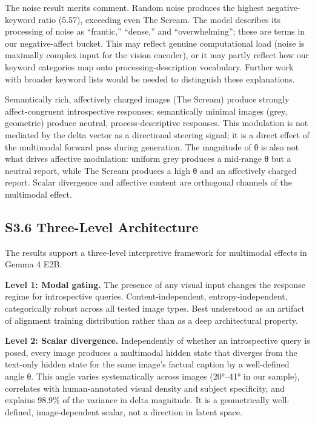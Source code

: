 \documentclass[11pt,a4paper]{article}
\begin{document}
The noise result merits comment. Random noise produces the highest negative-keyword ratio (5.57), exceeding even The Scream. The model describes its processing of noise as ``frantic,'' ``dense,'' and ``overwhelming''; these are terms in our negative-affect bucket. This may reflect genuine computational load (noise is maximally complex input for the vision encoder), or it may partly reflect how our keyword categories map onto processing-description vocabulary. Further work with broader keyword lists would be needed to distinguish these explanations.

Semantically rich, affectively charged images (The Scream) produce strongly affect-congruent introspective responses; semantically minimal images (grey, geometric) produce neutral, process-descriptive responses. This modulation is not mediated by the delta vector as a directional steering signal; it is a direct effect of the multimodal forward pass during generation. The magnitude of θ is also not what drives affective modulation: uniform grey produces a mid-range θ but a neutral report, while The Scream produces a high θ and an affectively charged report. Scalar divergence and affective content are orthogonal channels of the multimodal effect.

\subsection*{S3.6 Three-Level Architecture}

The results support a three-level interpretive framework for multimodal effects in Gemma 4 E2B.

\textbf{Level 1: Modal gating.} The presence of any visual input changes the response regime for introspective queries. Content-independent, entropy-independent, categorically robust across all tested image types. Best understood as an artifact of alignment training distribution rather than as a deep architectural property.

\textbf{Level 2: Scalar divergence.} Independently of whether an introspective query is posed, every image produces a multimodal hidden state that diverges from the text-only hidden state for the same image's factual caption by a well-defined angle θ. This angle varies systematically across images (20°--41° in our sample), correlates with human-annotated visual density and subject specificity, and explains 98.9\% of the variance in delta magnitude. It is a geometrically well-defined, image-dependent scalar, not a direction in latent space.
\end{document}
